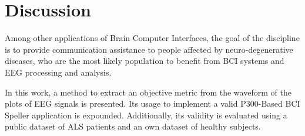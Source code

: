 \documentclass[utf8]{frontiersSCNS} %
\begin{document}

\section{Discussion}
\label{discussion}





Among other applications of Brain Computer Interfaces, the goal of the discipline is to provide communication assistance to people affected by neuro-degenerative diseases, who are the most likely population to benefit from BCI systems and EEG processing and analysis.

In this work, a method to extract an objective metric from the waveform of the plots of EEG signals is presented.  Its usage to implement a valid P300-Based BCI Speller application is expounded.  Additionally, its validity is evaluated using a public dataset of ALS patients and an own dataset of healthy subjects. 
\end{document}
